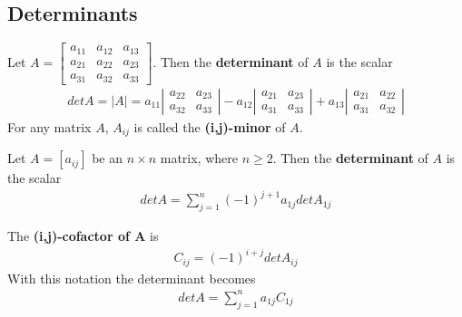 \documentclass{article}
\begin{document}
\subsection{Determinants}
\begin{definition}
    Let $A=\begin{bmatrix}
            a_{11} & a_{12} & a_{13} \\
            a_{21} & a_{22} & a_{23} \\
            a_{31} & a_{32} & a_{33}
        \end{bmatrix}$.
    Then the \textbf{determinant} of $A$ is the scalar
    \begin{align*}
        det A = |A| = a_{11}\left|\begin{array}{ccc}
            a_{22} & a_{23} \\
            a_{32} & a_{33}
        \end{array}\right| -
        a_{12}\left|\begin{array}{ccc}
            a_{21} & a_{23} \\
            a_{31} & a_{33}
        \end{array}\right| +
        a_{13}\left|\begin{array}{ccc}
            a_{21} & a_{22} \\
            a_{31} & a_{32}
        \end{array}\right|
    \end{align*}
    For any matrix $A$, $A_{ij}$ is called the \textbf{(i,j)-minor} of $A$.
\end{definition}
\begin{definition}
    Let $A=[a_{ij}]$ be an $n\times n$ matrix, where $n\geq 2$. Then the \textbf{determinant} of $A$ is the scalar
    \begin{align*}
        det A = \sum_{j=1}^n (-1)^{j+1}a_{1j}det A_{1j}
    \end{align*}
\end{definition}
\begin{definition}
    The \textbf{(i,j)-cofactor of A} is
    \begin{align*}
        C_{ij}=(-1)^{i+j}det A_{ij}
    \end{align*}
    With this notation the determinant becomes
    \begin{align*}
        det A = \sum^n_{j=1} a_{1j}C_{1j}
    \end{align*}
\end{definition}
\end{document}
